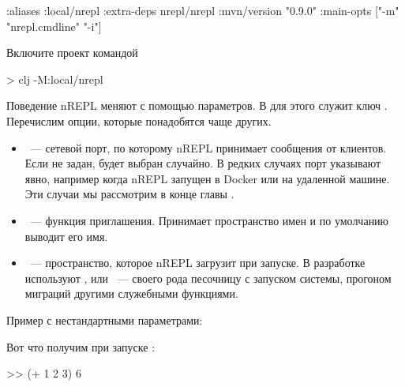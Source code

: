 \begin{english}
  \begin{clojure}
{:aliases
 {:local/nrepl
  {:extra-deps {nrepl/nrepl {:mvn/version "0.9.0"}}
   :main-opts ["-m" "nrepl.cmdline" "-i"]}}}
  \end{clojure}
\end{english}

Включите проект командой

\begin{english}
  \begin{bash}
> clj -M:local/nrepl
  \end{bash}
\end{english}

Поведение nREPL меняют с помощью параметров. В  для этого служит ключ . Перечислим опции, которые понадобятся чаще других.

\begin{itemize}

\item
  ~--- сетевой порт, по которому nREPL принимает сообщения от клиентов. Если не задан, будет выбран случайно. В редких случаях порт указывают явно, например когда nREPL запущен в Docker или на удаленной машине. Эти случаи мы рассмотрим в конце главы .

\item
  ~--- функция приглашения. Принимает пространство имен и по умолчанию выводит его имя.

\item
  ~--- пространство, которое nREPL загрузит при запуске. В разработке используют ,  или ~--- своего рода песочницу с запуском системы, прогоном миграций другими служебными функциями.

\end{itemize}

Пример с нестандартными параметрами:

\begin{english}
\end{english}

Вот что получим при запуске :

\begin{english}
  \begin{bash}
[dev] >> (+ 1 2 3)
6
  \end{bash}
\end{english}


